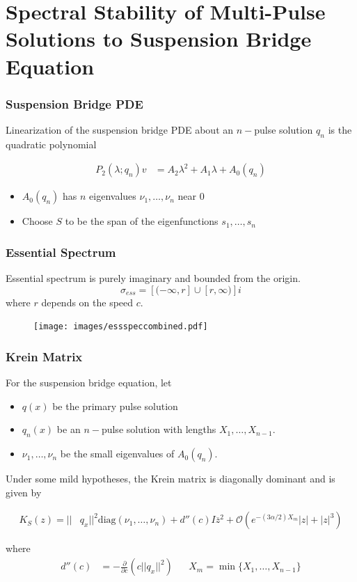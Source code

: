 \documentclass[16pt]{beamer}
\begin{document}
\section{Spectral Stability of Multi-Pulse Solutions to Suspension Bridge Equation}

\begin{frame}
\frametitle{Suspension Bridge PDE}
	Linearization of the suspension bridge PDE about an $n-$pulse solution $q_n$ is the quadratic polynomial

    \begin{align*}
    P_2(\lambda; q_n)v &= A_2 \lambda^2 + A_1 \lambda + A_0(q_n)
    \end{align*}

    \begin{itemize}
    \item $A_0(q_n)$ has $n$ eigenvalues $\nu_1, \dots, \nu_n$ near 0
    \item Choose $S$ to be the span of the eigenfunctions $s_1, \dots, s_n$
	\end{itemize}

\end{frame}

\begin{frame}
\frametitle{Essential Spectrum}
	Essential spectrum is purely imaginary and bounded from the origin.
	\[ \sigma_{ess} = [ (-\infty, r] \cup [r, \infty) ]i \]
	where $r$ depends on the speed $c$.
	\begin{figure}
	\begin{center}
	\texttt{[image: images/essspeccombined.pdf]}
	\end{center}
	\end{figure}
\end{frame}

\begin{frame}
\frametitle{Krein Matrix}
	\begin{theorem}[Kapitula et al., 2019]
	For the suspension bridge equation, let
	\begin{itemize}
		\item $q(x)$ be the primary pulse solution
		\item $q_n(x)$ be an $n-$pulse solution with lengths $X_1, \dots, X_{n-1}$. 
		\item $\nu_1, \dots, \nu_n$ be the small eigenvalues of $A_0(q_n)$.
	\end{itemize} 
	Under some mild hypotheses, the Krein matrix is diagonally dominant and is given by

    \begin{align*}\label{Kreinapprox}
    K_S(z) = ||&q_x||^2 \text{diag} (\nu_1, \dots, \nu_n) 
     + d''(c) I \overline{z}^2 + \mathcal{O}(e^{-(3 \alpha/2) X_m}|z| + |z|^3)
    \end{align*}

    where
    \vspace{-1.5ex}
    \begin{align*}
    d''(c) &= -\frac{\partial}{\partial c} \left( c ||q_x||^2 \right)  &&
    X_m = \min\{ X_1, \dots, X_{n-1} \} 
    \end{align*}
	\end{theorem}
\end{frame}
\end{document}
